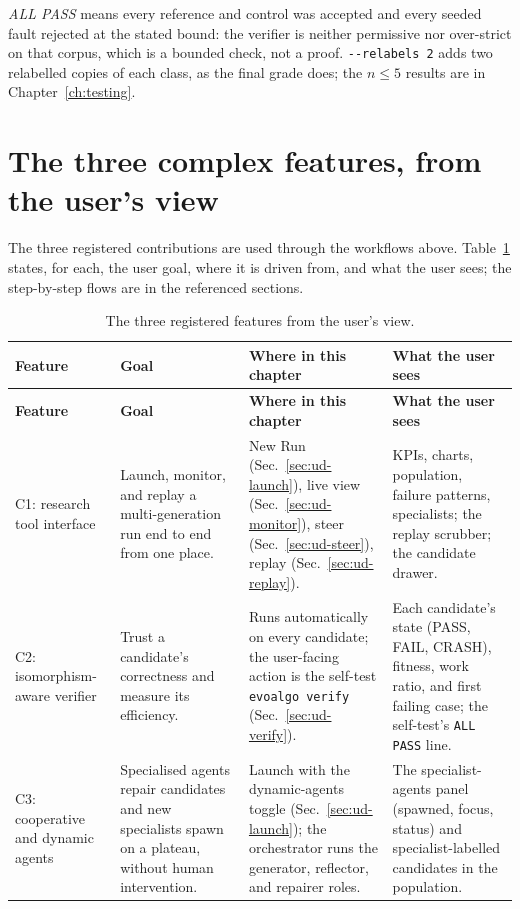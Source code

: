 \emph{ALL PASS} means every reference and control was accepted and every
seeded fault rejected at the stated bound: the verifier is neither permissive nor
over-strict on that corpus, which is a bounded check, not a proof.
\texttt{-{}-relabels 2} adds two relabelled copies of each class, as the final
grade does; the $n \le 5$ results are in Chapter~\ref{ch:testing}.

\section{The three complex features, from the user's view}
\label{sec:ud-features}

The three registered contributions are used through the workflows above.
Table~\ref{tab:ud-features} states, for each, the user goal, where it is driven
from, and what the user sees; the step-by-step flows are in the referenced
sections.

\begin{center}
\footnotesize
\setlength{\tabcolsep}{5pt}
\begin{longtable}{@{}>{\raggedright\arraybackslash}p{}>{\raggedright\arraybackslash}p{}>{\raggedright\arraybackslash}p{}>{\raggedright\arraybackslash}p{}@{}}
\caption{The three registered features from the user's view.}\label{tab:ud-features}\\
\toprule
\textbf{Feature} & \textbf{Goal} & \textbf{Where in this chapter} & \textbf{What the user sees} \\
\midrule
\endfirsthead
\toprule
\textbf{Feature} & \textbf{Goal} & \textbf{Where in this chapter} & \textbf{What the user sees} \\
\midrule
\endhead
\bottomrule
\endfoot
C1: research tool interface & Launch, monitor, and replay a multi-generation run end to end from one place. & New Run (Sec.~\ref{sec:ud-launch}), live view (Sec.~\ref{sec:ud-monitor}), steer (Sec.~\ref{sec:ud-steer}), replay (Sec.~\ref{sec:ud-replay}). & KPIs, charts, population, failure patterns, specialists; the replay scrubber; the candidate drawer. \\
\midrule
C2: isomorphism-aware verifier & Trust a candidate's correctness and measure its efficiency. & Runs automatically on every candidate; the user-facing action is the self-test \texttt{evoalgo verify} (Sec.~\ref{sec:ud-verify}). & Each candidate's state (PASS, FAIL, CRASH), fitness, work ratio, and first failing case; the self-test's \texttt{ALL PASS} line. \\
\midrule
C3: cooperative and dynamic agents & Specialised agents repair candidates and new specialists spawn on a plateau, without human intervention. & Launch with the dynamic-agents toggle (Sec.~\ref{sec:ud-launch}); the orchestrator runs the generator, reflector, and repairer roles. & The specialist-agents panel (spawned, focus, status) and specialist-labelled candidates in the population. \\
\bottomrule
\end{longtable}
\end{center}

